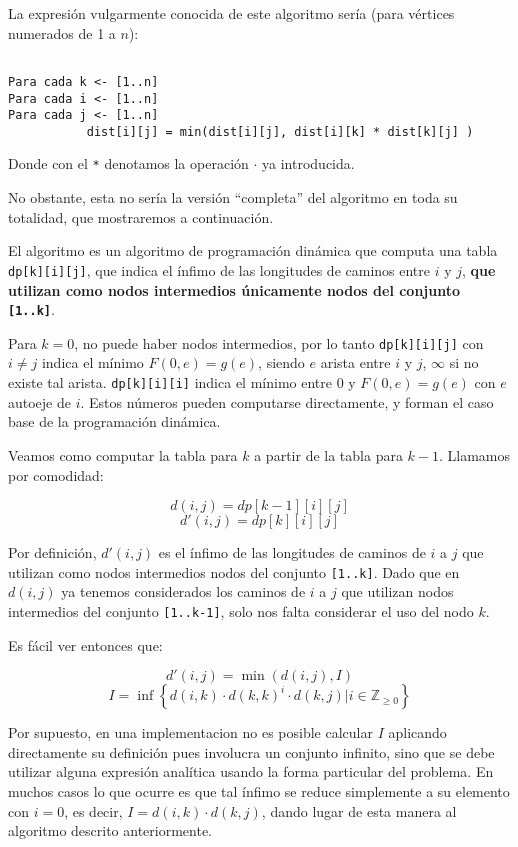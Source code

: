 \documentclass{article}
\begin{document}
La expresión vulgarmente conocida de este algoritmo sería (para vértices numerados de 1 a $n$):

\begin{verbatim}

Para cada k <- [1..n]
Para cada i <- [1..n]
Para cada j <- [1..n]
           dist[i][j] = min(dist[i][j], dist[i][k] * dist[k][j] )

\end{verbatim}

Donde con el \texttt{*} denotamos la operación $\cdot$ ya introducida.

No obstante, esta no sería la versión ``completa'' del algoritmo en toda su totalidad, que mostraremos a continuación.

El algoritmo es un algoritmo de programación dinámica que computa una tabla \texttt{dp[k][i][j]}, que indica el
ínfimo de las longitudes de caminos entre $i$ y $j$, \textbf{que utilizan como nodos intermedios únicamente nodos
del conjunto \texttt{[1..k]}}.

Para $k=0$, no puede haber nodos intermedios, por lo tanto \texttt{dp[k][i][j]}
con $i \neq j$ indica el mínimo $F(0,e) = g(e)$, siendo $e$ arista entre $i$ y $j$, $\infty$ si no existe tal arista.
\texttt{dp[k][i][i]} indica el mínimo entre $0$ y $F(0,e) = g(e)$ con $e$ autoeje de $i$. Estos números pueden computarse
directamente, y forman el caso base de la programación dinámica.

Veamos como computar la tabla para $k$ a partir de la tabla para $k-1$. Llamamos por comodidad:

$$d(i,j) = dp[k-1][i][j]$$
$$d'(i,j) = dp[k][i][j]$$

Por definición, $d'(i,j)$ es el ínfimo de las longitudes de caminos de $i$ a $j$ que utilizan como nodos
intermedios nodos del conjunto \texttt{[1..k]}. Dado que en $d(i,j)$ ya tenemos considerados los caminos de $i$ a $j$ que
utilizan nodos intermedios del conjunto \texttt{[1..k-1]}, solo nos falta considerar el uso del nodo $k$.

Es fácil ver entonces que:

$$d'(i,j) = \min(d(i,j), I)$$
$$I = \inf \left \{d(i,k) \cdot d(k,k)^i  \cdot d(k,j) | i \in \mathbb{Z}_{\geq 0} \right \}$$

Por supuesto, en una implementacion no es posible calcular $I$ aplicando directamente su definición pues involucra
un conjunto infinito, sino que se debe utilizar alguna expresión analítica usando la forma particular del problema.
En muchos casos lo que ocurre es que tal ínfimo se reduce simplemente a su elemento con $i=0$, es decir,
$I = d(i,k) \cdot d(k,j)$, dando lugar de esta manera al algoritmo descrito anteriormente.
\end{document}
